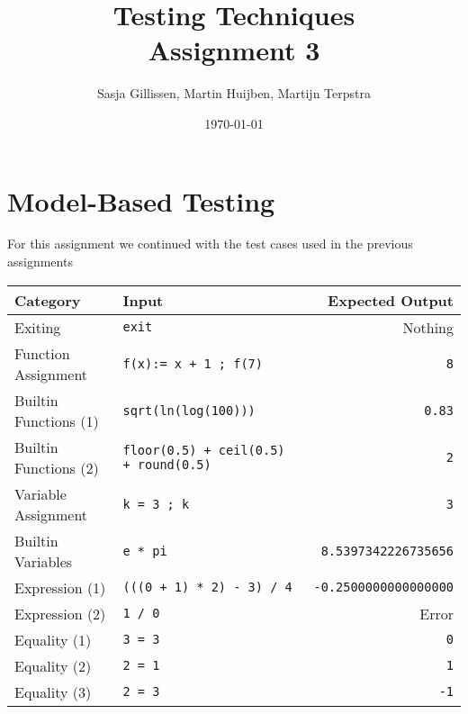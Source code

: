 \documentclass[11pt,a4paper]{article}
\author{Sasja Gillissen, Martin Huijben, Martijn Terpstra}
\date{\today}
\title{Testing Techniques\\
  \textbf{Assignment 3}}
\begin{document}
\maketitle




\section{Model-Based Testing}
For this assignment we continued with the test cases used in the previous assignments

\begin{center}
\begin{tabular}{llr}
Category & Input & Expected Output\\
\hline
Exiting & \texttt{exit} & Nothing\\
Function Assignment & \texttt{f(x):= x + 1 ; f(7)} & \texttt{8}\\
Builtin Functions (1) & \texttt{sqrt(ln(log(100)))} & \texttt{0.83}\\
Builtin Functions (2) & \texttt{floor(0.5) + ceil(0.5) + round(0.5)} & \texttt{2}\\
Variable Assignment & \texttt{k = 3 ; k} & \texttt{3}\\
Builtin Variables & \texttt{e * pi} & \texttt{8.5397342226735656}\\
Expression (1) & \texttt{(((0 + 1) * 2) - 3) / 4} & \texttt{-0.2500000000000000}\\
Expression (2) & \texttt{1 / 0} & Error\\
Equality (1) & \texttt{3 = 3} & \texttt{0}\\
Equality (2) & \texttt{2 = 1} & \texttt{1}\\
Equality (3) & \texttt{2 = 3} & \texttt{-1}\\
\end{tabular}
\end{center}
\end{document}
